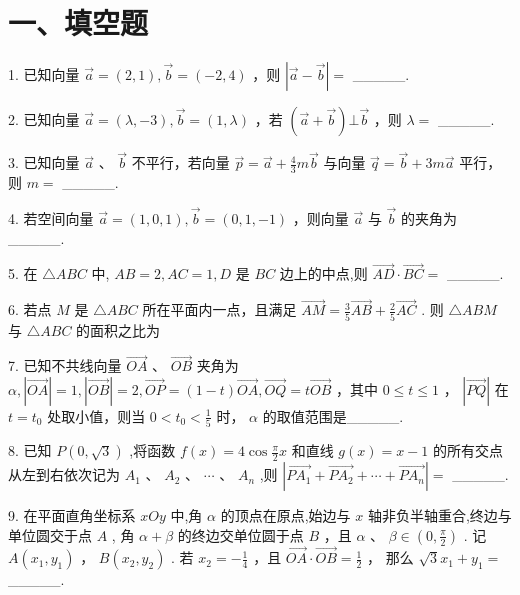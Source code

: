 \section*{一、填空题}

1. 已知向量 $\overrightarrow{a} = \left( {2,1}\right) ,\overrightarrow{b} = \left( {-2,4}\right)$ ，则 $\left| {\overrightarrow{a} - \overrightarrow{b}}\right|  =$ \_\_\_\_\_.

2. 已知向量 $\overrightarrow{a} = \left( {\lambda , - 3}\right) ,\overrightarrow{b} = \left( {1,\lambda }\right)$ ，若 $\left( {\overrightarrow{a} + \overrightarrow{b}}\right)  \bot  \overrightarrow{b}$ ，则 $\lambda  =$ \_\_\_\_\_.

3. 已知向量 $\overrightarrow{a}$ 、 $\overrightarrow{b}$ 不平行，若向量 $\overrightarrow{p} = \overrightarrow{a} + \frac{4}{3}m\overrightarrow{b}$ 与向量 $\overrightarrow{q} = \overrightarrow{b} + {3m}\overrightarrow{a}$ 平行，则 $m =$ \_\_\_\_\_.

4. 若空间向量 $\overrightarrow{a} = \left( {1,0,1}\right) ,\overrightarrow{b} = \left( {0,1, - 1}\right)$ ，则向量 $\overrightarrow{a}$ 与 $\overrightarrow{b}$ 的夹角为\_\_\_\_\_.

5. 在 $\bigtriangleup {ABC}$ 中, ${AB} = 2,{AC} = 1,D$ 是 ${BC}$ 边上的中点,则 $\overrightarrow{AD} \cdot  \overrightarrow{BC} =$ \_\_\_\_\_.

6. 若点 $M$ 是 $\bigtriangleup  {ABC}$ 所在平面内一点，且满足 $\overrightarrow{AM} = \frac{3}{5}\overrightarrow{AB} + \frac{2}{5}\overrightarrow{AC}$ . 则 $\bigtriangleup  {ABM}$ 与 $\bigtriangleup  {ABC}$ 的面积之比为

7. 已知不共线向量 $\overrightarrow{OA}\text{ 、 }\overrightarrow{OB}$ 夹角为 $\alpha ,\left| \overrightarrow{OA}\right|  = 1,\left| \overrightarrow{OB}\right|  = 2,\overrightarrow{OP} = \left( {1 - t}\right) \overrightarrow{OA},\overrightarrow{OQ} = t\overrightarrow{OB}$ ，其中 $0 \leq  t \leq  1$ ， $\left| \overrightarrow{PQ}\right|$ 在 $t = {t}_{0}$ 处取小值，则当 $0 < {t}_{0} < \frac{1}{5}$ 时， $\alpha$ 的取值范围是\_\_\_\_\_.

8. 已知 $P\left( {0,\sqrt{3}}\right)$ ,将函数 $f\left( x\right)  = 4\cos \frac{\pi }{2}x$ 和直线 $g\left( x\right)  = x - 1$ 的所有交点从左到右依次记为 ${A}_{1}$ 、 ${A}_{2}\text{ 、 }\cdots \text{ 、 }{A}_{n}$ ,则 $\left| {\overrightarrow{P{A}_{1}} + \overrightarrow{P{A}_{2}} + \cdots  + \overrightarrow{P{A}_{n}}}\right|  =$ \_\_\_\_\_.

9. 在平面直角坐标系 ${xOy}$ 中,角 $\alpha$ 的顶点在原点,始边与 $x$ 轴非负半轴重合,终边与单位圆交于点 $A$ , 角 $\alpha  + \beta$ 的终边交单位圆于点 $B$ ，且 $\alpha$ 、 $\beta  \in  \left( {0,\frac{\pi }{2}}\right)$ . 记 $A\left( {{x}_{1},{y}_{1}}\right)$ ， $B\left( {{x}_{2},{y}_{2}}\right)$ . 若 ${x}_{2} =  - \frac{1}{4}$ ，且 $\overrightarrow{OA} \cdot  \overrightarrow{OB} = \frac{1}{2}$ ， 那么 $\sqrt{3}{x}_{1} + {y}_{1} =$ \_\_\_\_\_.


